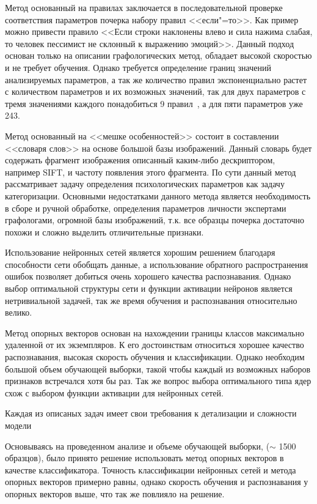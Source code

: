Метод основанный на правилах заключается в последовательной проверке соответствия параметров почерка набору правил <<если"=то>>. Как пример можно привести правило <<Если строки наклонены влево и сила нажима слабая, то человек пессимист не склонный к выражению эмоций>>. Данный подход основан только на описании графологических метод, обладает высокой скоростью и не требует обучения. Однако требуется определение границ значений анализируемых параметров, а так же количество правил экспоненциально растет с количеством параметров и их возможных значений, так для двух параметров с тремя значениями каждого понадобиться 9 правил~\cite{champa_ananda_kumar_rule_base}, а для пяти параметров уже 243.

Метод основанный на <<мешке особенностей>> состоит в составлении <<словаря слов>> на основе большой базы изображений. Данный словарь будет содержать фрагмент изображения описанный каким-либо дескриптором, например SIFT, и частоту появления этого фрагмента. По сути данный метод рассматривает задачу определения психологических параметров как задачу категоризации. Основными недостатками данного метода является необходимость в сборе и ручной обработке, определения параметров личности экспертами графологами, огромной базы изображений, т.к. все образцы почерка достаточно похожи и сложно выделить отличительные признаки.

Использование нейронных сетей является хорошим решением благодаря способности сети обобщать данные, а использование обратного распространения ошибок позволяет добиться очень хорошего качества распознавания. Однако выбор оптимальной структуры сети и функции активации нейронов является нетривиальной задачей, так же время обучения и распознавания относительно велико.

Метод опорных векторов основан на нахождении границы классов максимально удаленной от их экземпляров. К его достоинствам относиться хорошее качество распознавания, высокая скорость обучения и классификации. Однако необходим большой объем обучающей выборки, такой чтобы каждый из возможных наборов признаков встречался хотя бы раз. Так же вопрос выбора оптимального типа ядер схож с выбором функции активации для нейронных сетей.

Каждая из описаных задач имеет свои требования к детализации и сложности модели

Основываясь на проведенном анализе и объеме обучающей выборки, ($\sim$ 1500 образцов), было принято решение использовать метод опорных векторов в качестве классификатора. Точность классификации нейронных сетей и метода опорных векторов примерно равны, однако скорость обучения и распознавания у опорных векторов выше, что так же повлияло на решение.

